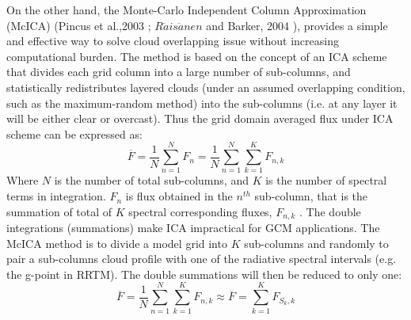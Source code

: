  On the other hand, the Monte-\/\+Carlo Independent Column Approximation (Mc\+I\+CA) (Pincus et al.,2003 \cite{pincus_et_al_2003} ; $R\ddot{a}is\ddot{a}nen$ and Barker, 2004 \cite{raisanen_and_barker_2004}), provides a simple and effective way to solve cloud overlapping issue without increasing computational burden. The method is based on the concept of an I\+CA scheme that divides each grid column into a large number of sub-\/columns, and statistically redistributes layered clouds (under an assumed overlapping condition, such as the maximum-\/random method) into the sub-\/columns (i.\+e. at any layer it will be either clear or overcast). Thus the grid domain averaged flux under I\+CA scheme can be expressed as\+: \[ \overline{F}=\frac{1}{N}\sum_{n=1}^N F_{n} =\frac{1}{N}\sum_{n=1}^N\sum_{k=1}^K F_{n,k} \] Where $N$ is the number of total sub-\/columns, and $K$ is the number of spectral terms in integration. $F_{n}$ is flux obtained in the $n^{th}$ sub-\/column, that is the summation of total of $K$ spectral corresponding fluxes, $F_{n,k}$ . The double integrations (summations) make I\+CA impractical for G\+CM applications. The Mc\+I\+CA method is to divide a model grid into $K$ sub-\/columns and randomly to pair a sub-\/column\textquotesingle{}s cloud profile with one of the radiative spectral intervals (e.\+g. the g-\/point in R\+R\+TM). The double summations will then be reduced to only one\+: \[ \overline{F}=\frac{1}{N}\sum_{n=1}^N\sum_{k=1}^K F_{n,k} \approx\overline{F}=\sum_{k=1}^K F_{S_{k},k} \]

